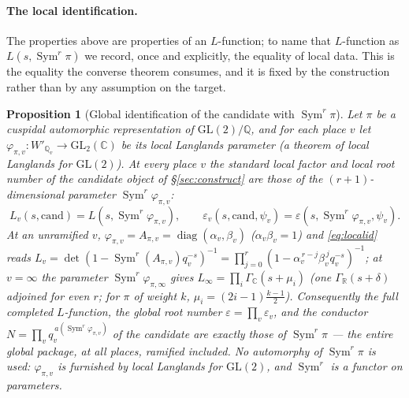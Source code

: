 \documentclass[11pt]{article}
\newtheorem{proposition}[theorem]{Proposition}
\theoremstyle{definition}
\newcommand{\Sym}{\operatorname{Sym}}
\begin{document}
\paragraph{The local identification.} The properties above are properties of an $L$-function; to name
that $L$-function as $L(s,\Sym^r\pi)$ we record, once and explicitly, the equality of local data. This
is the equality the converse theorem consumes, and it is fixed by the construction rather than by any
assumption on the target.

\begin{proposition}[Global identification of the candidate with $\Sym^r\pi$]\label{prop:localid}
Let $\pi$ be a cuspidal automorphic representation of $\mathrm{GL}(2)/\mathbb Q$, and for each place $v$
let $\varphi_{\pi,v}\colon W'_{\mathbb Q_v}\to\mathrm{GL}_2(\mathbb C)$ be its local Langlands parameter
(a theorem of local Langlands for $\mathrm{GL}(2)$). At \emph{every} place $v$ the standard local factor
and local root number of the candidate object of \S\ref{sec:construct} are those of the $(r{+}1)$-dimen\-sional
parameter $\Sym^r\varphi_{\pi,v}$:
\begin{equation}\label{eq:localid}
  L_v(s,\mathrm{cand})=L\!\left(s,\Sym^r\varphi_{\pi,v}\right),\qquad
  \varepsilon_v(s,\mathrm{cand},\psi_v)=\varepsilon\!\left(s,\Sym^r\varphi_{\pi,v},\psi_v\right).
\end{equation}
At an unramified $v$, $\varphi_{\pi,v}=A_{\pi,v}=\operatorname{diag}(\alpha_v,\beta_v)$ ($\alpha_v\beta_v
=1$) and \eqref{eq:localid} reads $L_v=\det(1-\Sym^r(A_{\pi,v})q_v^{-s})^{-1}=\prod_{j=0}^{r}(1-\alpha_v^{
\,r-j}\beta_v^{\,j}q_v^{-s})^{-1}$; at $v=\infty$ the parameter $\Sym^r\varphi_{\pi,\infty}$ gives
$L_\infty=\prod_i\Gamma_{\mathbb C}(s+\mu_i)$ (one $\Gamma_{\mathbb R}(s+\delta)$ adjoined for even $r$;
for $\pi$ of weight $k$, $\mu_i=(2i{-}1)\tfrac{k-1}2$). Consequently the \emph{full} completed
$L$-function, the global root number $\varepsilon=\prod_v\varepsilon_v$, and the conductor
$N=\prod_v q_v^{\,a(\Sym^r\varphi_{\pi,v})}$ of the candidate are exactly those of $\Sym^r\pi$ --- the
entire global package, at all places, ramified included. No automorphy of $\Sym^r\pi$ is used:
$\varphi_{\pi,v}$ is furnished by local Langlands for $\mathrm{GL}(2)$, and $\Sym^r$ is a functor on
parameters.
\end{proposition}
\end{document}
